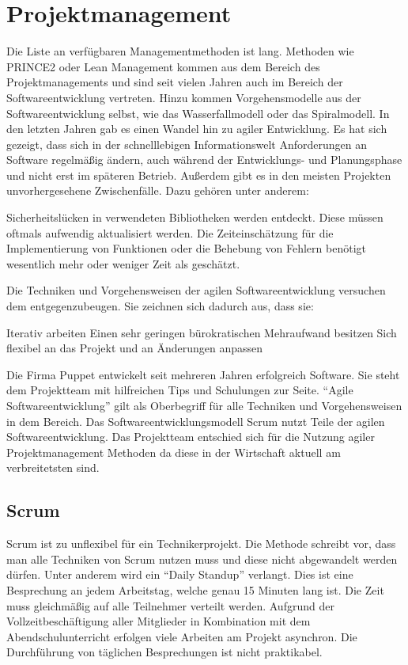 \section{Projektmanagement}
Die Liste an verfügbaren Managementmethoden ist lang. Methoden wie PRINCE2 oder
Lean Management kommen aus dem Bereich des Projektmanagements und sind seit
vielen Jahren auch im Bereich der Softwareentwicklung vertreten. Hinzu kommen
Vorgehensmodelle aus der Softwareentwicklung selbst, wie das Wasserfallmodell
oder das Spiralmodell. In den letzten Jahren gab es einen Wandel hin zu agiler
Entwicklung. Es hat sich gezeigt, dass sich in der schnelllebigen
Informationswelt Anforderungen an Software regelmäßig ändern, auch während der
Entwicklungs- und Planungsphase und nicht erst im späteren Betrieb. Außerdem
gibt es in den meisten Projekten unvorhergesehene Zwischenfälle. Dazu gehören
unter anderem:

\begin{outline}
  \1 Sicherheitslücken in verwendeten Bibliotheken werden entdeckt. Diese
  müssen oftmals aufwendig aktualisiert werden.
  \1 Die Zeiteinschätzung für die Implementierung von Funktionen oder die
  Behebung von Fehlern benötigt wesentlich mehr oder weniger Zeit als
  geschätzt.
\end{outline}

Die Techniken und Vorgehensweisen der agilen Softwareentwicklung versuchen dem
entgegenzubeugen. Sie zeichnen sich dadurch aus, dass sie:

\begin{outline}
  \1 Iterativ arbeiten
  \1 Einen sehr geringen bürokratischen Mehraufwand besitzen
  \1 Sich flexibel an das Projekt und an Änderungen anpassen
\end{outline}

Die Firma Puppet entwickelt seit mehreren Jahren erfolgreich Software. Sie
steht dem Projektteam mit hilfreichen Tips und Schulungen zur Seite. ``Agile
Softwareentwicklung'' gilt als Oberbegriff für alle Techniken und
Vorgehensweisen in dem Bereich. Das Softwareentwicklungsmodell Scrum nutzt
Teile der agilen Softwareentwicklung. Das Projektteam entschied sich für die
Nutzung agiler Projektmanagement Methoden da diese in der Wirtschaft aktuell am
verbreitetsten sind.
\tm%

\subsection{Scrum}
Scrum ist zu unflexibel für ein Technikerprojekt. Die Methode schreibt vor,
dass man alle Techniken von Scrum nutzen muss und diese nicht abgewandelt
werden dürfen.  Unter anderem wird ein ``Daily Standup'' verlangt. Dies ist
eine Besprechung an jedem Arbeitstag, welche genau 15 Minuten lang ist. Die
Zeit muss gleichmäßig auf alle Teilnehmer verteilt werden. Aufgrund der
Vollzeitbeschäftigung aller Mitglieder in Kombination mit dem
Abendschulunterricht erfolgen viele Arbeiten am Projekt asynchron. Die
Durchführung von täglichen Besprechungen ist nicht
praktikabel.~\cite{scrum_talk}
\tm%

